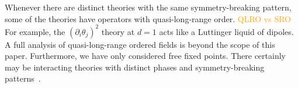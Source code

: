 \documentclass[pra,aps,twocolumn, amsfonts,amsmath,amssymb,nofootinbib,superscriptaddress]{revtex4-2}
\newcommand{\todo}[1]{\textcolor{orange}{#1}}
\newcommand{\charlie}[1]{\textcolor{Blue}{#1}}
\newcommand{\goesto}{\rightarrow}
\renewcommand{\max}{\text{max}}
\newcommand{\cl}{\text{cl}}
\newcommand{\q}{\text{q}}
\newcommand{\ethan}[1]{ { \color{blue} \footnotesize \textsf{ethan: \textsl{#1}} }}
\begin{document}
Whenever there are distinct theories with the same symmetry-breaking pattern, some of the theories have operators with quasi-long-range order. \todo{QLRO vs SRO} For example, the $(\partial_i\theta_j)^2$  theory at $d=1$ acts like a Luttinger liquid of dipoles. A full analysis of quasi-long-range ordered fields is beyond the scope of this paper. Furthermore, we have only considered free fixed points. There certainly may be interacting theories with distinct phases and symmetry-breaking patterns~\cite{TonerRadzihovsky}.





\end{document}

